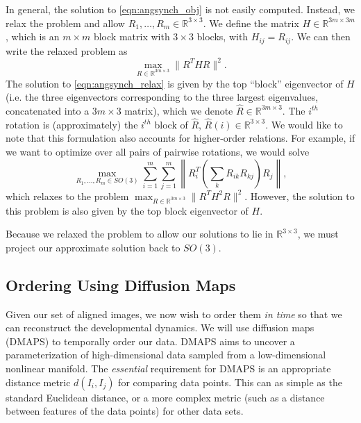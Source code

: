 \documentclass[11pt]{article}
\begin{document}
In general, the solution to \eqref{eqn:angsynch_obj} is not easily computed.
%
Instead, we relax the problem and allow $R_1, \dots, R_m \in \mathbb{R}^{3 \times 3}$.
%
We define the matrix $H \in \mathbb{R}^{3m \times 3m}$, which is an $m \times m$ block matrix with $3 \times 3$ blocks, with $H_{ij} = R_{ij}$.
%
We can then write the relaxed problem as 
\begin{equation} \label{eqn:angsynch_relax}
\max_{R\in \mathbb{R}^{3m \times 3}} \| R^T H R \|^2.
\end{equation}
%
The solution to \eqref{eqn:angsynch_relax} is given by the top ``block'' eigenvector of $H$ (i.e. the three eigenvectors corresponding to the three largest eigenvalues, concatenated into a $3m \times 3$ matrix), which we denote $\hat{R} \in \mathbb{R}^{3m \times 3}$. 
%
The $i^{th}$ rotation is (approximately) the $i^{th}$ block of $\hat{R}$, $\hat{R}(i) \in \mathbb{R}^{3 \times 3}$.
%
We would like to note that this formulation also accounts for higher-order relations.
%
For example, if we want to optimize over all pairs of pairwise rotations, we would solve 
\begin{equation}
\max_{R_1, \dots, R_m \in SO(3)} \sum_{i=1}^{m} \sum_{j=1}^{m} \left\| R_i^T \left( \sum_k R_{ik} R_{kj} \right) R_j \right\|,
\end{equation} 
%
which relaxes to the problem $ \max_{R \in \mathbb{R}^{3m \times 3}} \| R^T H^2 R \|^2$.
%
However, the solution to this problem is also given by the top block eigenvector of $H$. 

Because we relaxed the problem to allow our solutions to lie in $\mathbb{R}^{3 \times 3}$, we must project our approximate solution back to $SO(3)$.
%


\subsection{Ordering Using Diffusion Maps}

Given our set of aligned images, we now wish to order them {\em in time} so that we can reconstruct the developmental dynamics.
%
We will use diffusion maps (DMAPS) \cite{coifman2005geometric} to temporally order our data.
%
DMAPS aims to uncover a parameterization of high-dimensional data sampled from a low-dimensional nonlinear manifold.
%
The {\em essential} requirement for DMAPS is an appropriate distance metric $d(I_i, I_j)$ for comparing data points. 
%
This can as simple as the standard Euclidean distance, or a more complex metric (such as a distance between features of the data points) for other data sets.
\end{document}
